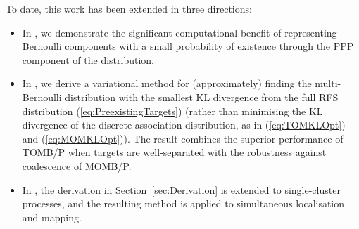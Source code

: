 \documentclass[journal,twoside]{IEEEtran}
\theoremstyle{plain}
\begin{document}
To date, this work has been extended in three directions:
%
\begin{itemize}
\item In \cite{Wil12F2}, we demonstrate the significant computational benefit of representing Bernoulli components with a small probability of existence through the PPP component of the distribution.

\item In \cite{Wil14}, we derive a variational method for (approximately) finding the multi-Bernoulli distribution with the smallest KL divergence from the full RFS distribution (\ref{eq:PreexistingTargets}) (rather than minimising the KL divergence of the discrete association distribution, as in (\ref{eq:TOMKLOpt}) and (\ref{eq:MOMKLOpt})). The result combines the superior performance of TOMB/P when targets are well-separated with the robustness against coalescence of MOMB/P.

\item In \cite{BreKal14}, the derivation in Section~\ref{sec:Derivation} is extended to single-cluster processes, and the resulting method is applied to simultaneous localisation and mapping.
\end{itemize}



\appendices
\end{document}
